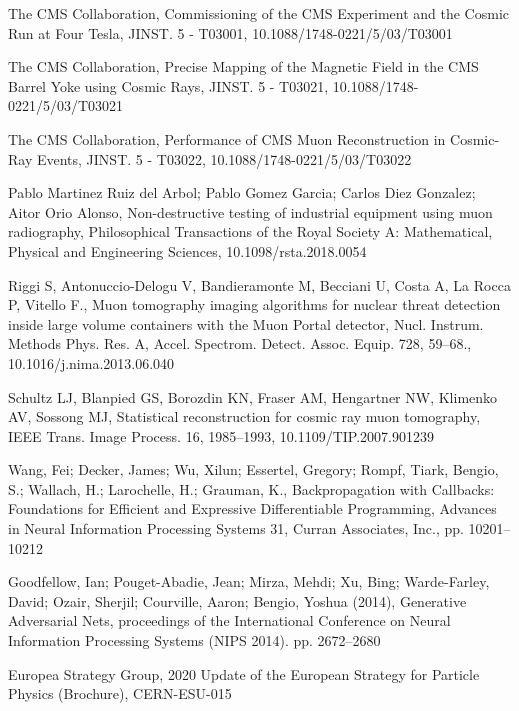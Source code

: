 \begin{thebibliography}{20}
  {The CMS Collaboration, Commissioning of the CMS Experiment and the Cosmic Run at Four Tesla, JINST. 5 - T03001, 10.1088/1748-0221/5/03/T03001}
  
  {The CMS Collaboration, Precise Mapping of the Magnetic Field in the CMS Barrel Yoke using Cosmic Rays, JINST. 5 - T03021, 10.1088/1748-0221/5/03/T03021}
   
  {The CMS Collaboration, Performance of CMS Muon Reconstruction in Cosmic-Ray Events, JINST. 5 - T03022, 10.1088/1748-0221/5/03/T03022}
  
  {Pablo Martinez Ruiz del Arbol; Pablo Gomez Garcia; Carlos Diez Gonzalez; Aitor Orio Alonso, Non-destructive testing of industrial equipment using muon radiography, Philosophical Transactions of the Royal Society A: Mathematical, Physical and Engineering Sciences, 10.1098/rsta.2018.0054}
  
  {Riggi S, Antonuccio-Delogu V, Bandieramonte M, Becciani U, Costa A, La Rocca P, Vitello F., Muon tomography imaging algorithms for nuclear threat detection inside large volume containers with the Muon Portal detector, Nucl. Instrum. Methods Phys. Res. A, Accel. Spectrom. Detect. Assoc. Equip. 728, 59–68., 10.1016/j.nima.2013.06.040}
 
  {Schultz LJ, Blanpied GS, Borozdin KN, Fraser AM, Hengartner NW, Klimenko AV, Sossong MJ, Statistical reconstruction for cosmic ray muon tomography, IEEE Trans. Image Process. 16, 1985–1993, 10.1109/TIP.2007.901239}

  {Wang, Fei; Decker, James; Wu, Xilun; Essertel, Gregory; Rompf, Tiark, Bengio, S.; Wallach, H.; Larochelle, H.; Grauman, K., Backpropagation with Callbacks: Foundations for Efficient and Expressive Differentiable Programming, Advances in Neural Information Processing Systems 31, Curran Associates, Inc., pp. 10201–10212}

  {Goodfellow, Ian; Pouget-Abadie, Jean; Mirza, Mehdi; Xu, Bing; Warde-Farley, David; Ozair, Sherjil; Courville, Aaron; Bengio, Yoshua (2014), Generative Adversarial Nets, proceedings of the International Conference on Neural Information Processing Systems (NIPS 2014). pp. 2672–2680}
  
  {Europea Strategy Group, 2020 Update of the European Strategy for Particle Physics (Brochure), CERN-ESU-015}
  

 



\end{thebibliography}


